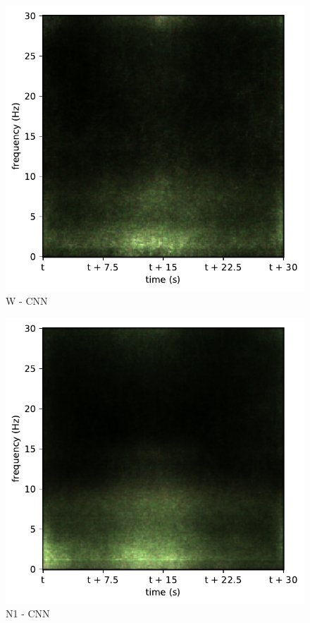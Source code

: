 \begin{subfigure}{.16\textwidth}
  \centering
  \includegraphics[width=1\linewidth]{./pics/class_master_0}
  \caption{W - CNN}
  \label{fig_1_21}
\end{subfigure}%
\begin{subfigure}{.16\textwidth}
  \centering
  \includegraphics[width=1\linewidth]{./pics/class_master_1}
  \caption{N1 - CNN}
  \label{fig_1_22}
\end{subfigure}%
